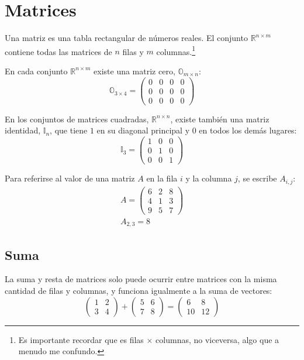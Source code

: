 \documentclass[../teoria.root.tex]{subfiles}
\begin{document}
\section{Matrices}

Una matriz es una tabla rectangular de números reales. El conjunto
$\mathbb{R}^{n\times m}$ contiene todas las matrices de $n$ filas y $m$
columnas.\footnote{Es importante recordar que es filas $\times$ columnas, no
viceversa, algo que a menudo me confundo.}

En cada conjunto $\mathbb{R}^{n\times m}$ existe una matriz cero,
$\mathbb{O}_{m\times n}$:
\[\mathbb{O}_{3\times 4}=\begin{pmatrix}
	0 & 0 & 0 & 0 \\
	0 & 0 & 0 & 0 \\
	0 & 0 & 0 & 0
\end{pmatrix}\]

En los conjuntos de matrices cuadradas, $\mathbb{R}^{n\times n}$, existe
también una matriz identidad, $\mathbb{I}_n$, que tiene $1$ en su diagonal
principal y $0$ en todos los demás lugares:
\[\mathbb{I}_3=\begin{pmatrix}
	1 & 0 & 0 \\
	0 & 1 & 0 \\
	0 & 0 & 1
\end{pmatrix}\]

Para referirse al valor de una matriz $A$ en la fila $i$ y la columna $j$, se
escribe $A_{i,j}$:
\begin{gather*}
	A=\begin{pmatrix}
		6 & 2 & 8 \\
		4 & 1 & 3 \\
		9 & 5 & 7
	\end{pmatrix}\\
	A_{2,3}=8
\end{gather*}

\subsection{Suma}

La suma y resta de matrices solo puede ocurrir entre matrices con la misma
cantidad de filas y columnas, y funciona igualmente a la suma de vectores:
\[\begin{pmatrix}
	1 & 2 \\
	3 & 4
\end{pmatrix}+\begin{pmatrix}
	5 & 6 \\
	7 & 8
\end{pmatrix}=\begin{pmatrix}
	 6 &  8 \\
	10 & 12
\end{pmatrix}\]
\end{document}
